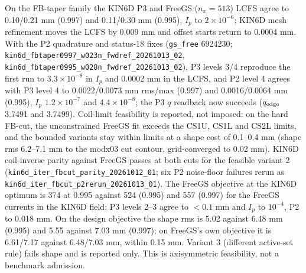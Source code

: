 On the FB-taper family the KIN6D P3 and FreeGS ($n_x=513$) LCFS agree to 0.10/0.21 mm
(0.997) and 0.11/0.30 mm (0.995), $I_p$ to $2\times10^{-6}$; KIN6D mesh refinement moves
the LCFS by 0.009 mm and offset starts return to 0.0004 mm. With the P2 quadrature and status-18 fixes (\texttt{gs\_free} 6924230;
\texttt{kin6d\_fbtaper0997\_w023n\_fwdref\_20261013\_02}, \texttt{kin6d\_fbtaper0995\_w028n\_fwdref\_20261013\_02}),
P3 levels 3/4 reproduce the first run to $3.3\times10^{-8}$ in $I_p$ and 0.0002 mm in the LCFS,
and P2 level 4 agrees with P3 level 4 to 0.0022/0.0073 mm rms/max (0.997) and
0.0016/0.0064 mm (0.995), $I_p$ $1.2\times10^{-7}$ and $4.4\times10^{-8}$; the P3
$q$ readback now succeeds ($q_{\rm edge}$ 3.7491 and 3.7499). Coil-limit feasibility is reported, not imposed: on the
hard FB-cut, the unconstrained FreeGS fit exceeds the CS1U, CS1L and CS2L limits, and the
bounded variants stay within limits at a shape cost of 0.1--0.4 mm (shape rms 6.2--7.1 mm
to the modx03 cut contour, grid-converged to 0.02 mm). KIN6D coil-inverse parity against FreeGS passes at both cuts for the feasible variant 2
(\texttt{kin6d\_iter\_fbcut\_parity\_20261012\_01}; six P2 noise-floor failures rerun as
\texttt{kin6d\_iter\_fbcut\_p2rerun\_20261013\_01}). The FreeGS objective at the KIN6D optimum
is 374 at 0.995 against 524 (0.995) and 557 (0.997) for the FreeGS currents in the KIN6D
field; P3 levels 2--3 agree to $<0.1$ mm and $I_p$ to $10^{-4}$, P2 to 0.018 mm. On the design
objective the shape rms is 5.02 against 6.48 mm (0.995) and 5.55 against 7.03 mm (0.997);
on FreeGS's own objective it is 6.61/7.17 against 6.48/7.03 mm, within 0.15 mm. Variant 3
(different active-set rule) fails shape and is reported only. This is axisymmetric
feasibility, not a benchmark admission.

